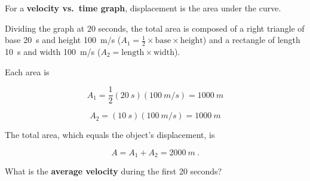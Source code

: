 \documentclass{exam}
\begin{document}
\begin{questions}
\begin{solutionorbox}[2.5in]
For a \textbf{velocity vs.~time graph}, displacement is the area under the curve. 


Dividing the graph at 20 seconds, the total area is composed of a right triangle of base \SI{20}{s} and height \SI{100}{m/s} ($A_1 = \frac{1}{2} \times \mathrm{base} \times \mathrm{height}$) and a rectangle of length \SI{10}{s} and width \SI{100}{m/s} ($A_2 = \mathrm{length} \times \mathrm{width}$).

Each area is

\begin{equation*}
    A_1 = \frac{1}{2}\left(\SI{20}{s}\right)\left(\SI{100}{m/s}\right) = \SI{1000}{m}
\end{equation*}

\begin{equation*}
    A_2 = (\SI{10}{s})(\SI{100}{m/s}) = \SI{1000}{m}
\end{equation*}

The total area, which equals the object's displacement, is

\begin{equation*}
    A = A_1 + A_2 = \SI{2000}{m}\ .
\end{equation*}

\end{solutionorbox}


\question
What is the \textbf{average velocity} during the first 20 seconds?


\end{questions}
\end{document}
